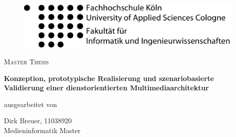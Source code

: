 
\begin{titlepage}

\begin{center}

\begin{figure}[!ht]
	\flushleft
		\includegraphics[natwidth=920pt, natheight=95pt, width=.5\textwidth]{images/fh_logo.pdf}
\end{figure}

\vspace{0.5cm}

\begin{Large}
  \textsc{Master Thesis}\\[0.7em]
\end{Large}

\begin{rmfamily}
  \LARGE
  \textbf{
  Konzeption, prototypische Realisierung und szenariobasierte Validierung einer dienstorientierten Multimediaarchitektur
  }\\
\normalsize
\end{rmfamily}

\vspace{0.5cm}

% 

ausgearbeitet von\\ 
\begin{Large}
Dirk Breuer, 11038920\\Medieninformatik Master\\
\end{Large}

\vspace{0.6cm}


\end{center}
\end{titlepage}
